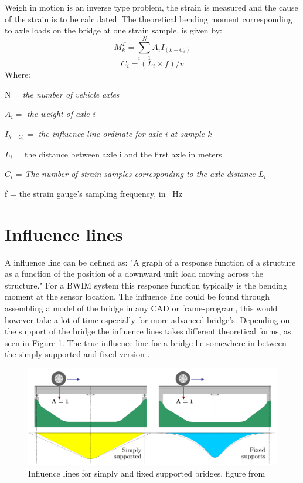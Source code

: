 Weigh in motion is an inverse type problem, the strain is measured and the cause of the strain is to be calculated. The theoretical bending moment corresponding to axle loads on the bridge at one strain sample, is given by:
\begin{equation}
M_k^T = \sum_{i = 1}^{N} A_i I_{(k-C_i)}
\label{equation:theoretical_strain}
\end{equation}
\begin{equation}
C_i = (L_i \times f)/v
\end{equation}
Where:
\begin{description}
	\item N = \textit{the number of vehicle axles}
	\item $A_i = $ \textit{the weight of axle i}
	\item $I_{k-C_i} = $ \textit{the influence line ordinate for axle i at sample k}
	\item $L_i$ = the distance between axle i and the first axle in meters
	\item $C_i$  = \textit{The number of strain samples corresponding to the axle distance $L_i$}
	\item f = the strain gauge's sampling frequency, in \SI{}{\Hz}
\end{description}

\section{Influence lines}
A influence line can be defined as: "A graph of a response function of a structure as a function of the position of a downward unit load moving across the structure."
For a BWIM system this response function typically is the bending moment at the sensor location.
The influence line could be found through assembling a model of the bridge in any CAD or frame-program, this would however take a lot of time especially for more advanced bridge's. Depending on the support of the bridge the influence lines takes different theoretical forms, as seen in Figure \ref{fig:theoreticalInfl}. The true influence line for a bridge lie somewhere in between the simply supported and fixed version \cite[p.~146]{bwim_an_overview}.
\begin{figure}[h]
\centering
\includegraphics[width=\textwidth]{figures/inflLinesQuilligan}
\caption{Influence lines for simply and fixed supported bridges, figure from \cite{Quilligan}}
\label{fig:theoreticalInfl}
\end{figure}

